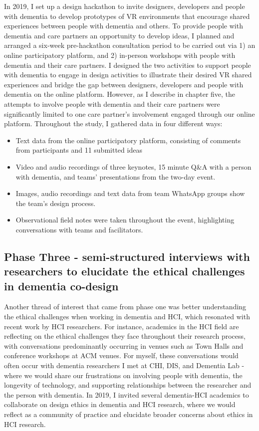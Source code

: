 In 2019, I set up a design hackathon to invite designers, developers and people with dementia to develop prototypes of VR environments that encourage shared experiences between people with dementia and others. To provide people with dementia and care partners an opportunity to develop ideas, I planned and arranged a six-week pre-hackathon consultation period to be carried out via 1) an online participatory platform, and 2) in-person workshops with people with dementia and their care partners. I designed the two activities to support people with dementia to engage in design activities to illustrate their desired VR shared experiences and bridge the gap between designers, developers and people with dementia on the online platform. However, as I describe in chapter five, the attempts to involve people with dementia and their care partners were significantly limited to one care partner's involvement engaged through our online platform. Throughout the study, I gathered data in four different ways:
\begin{itemize}
    \item Text data from the online participatory platform, consisting of comments from participants and 11 submitted ideas
    \item Video and audio recordings of three keynotes, 15 minute Q\&A with a person with dementia, and teams' presentations from the two-day event.
    \item Images, audio recordings and text data from team WhatsApp groups show the team's design process.
    \item Observational field notes were taken throughout the event, highlighting conversations with teams and facilitators.
\end{itemize}



\subsection{Phase Three - semi-structured interviews with researchers to elucidate the ethical challenges in dementia co-design}

Another thread of interest that came from phase one was better understanding the ethical challenges when working in dementia and HCI, which resonated with recent work by HCI researchers. For instance, academics in the HCI field are reflecting on the ethical challenges they face throughout their research process, with conversations predominantly occurring in venues such as Town Halls and conference workshops at ACM venues. For myself, these conversations would often occur with dementia researchers I met at CHI, DIS, and Dementia Lab - where we would share our frustrations on involving people with dementia, the longevity of technology, and supporting relationships between the researcher and the person with dementia. In 2019, I invited several dementia-HCI academics to collaborate on design ethics in dementia and HCI research, where we would reflect as a community of practice and elucidate broader concerns about ethics in HCI research.

